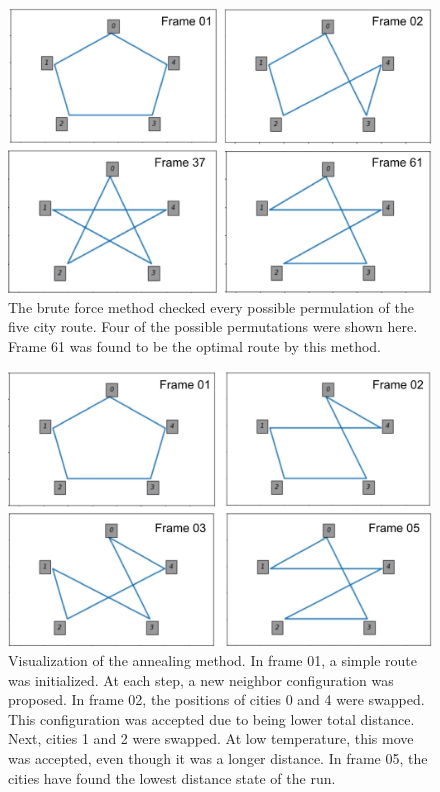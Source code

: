 \message{ !name(Assn1.tex)}\documentclass[twocolumn]{article}
\begin{document}
\begin{figure}
\centering
\includegraphics[width=\linewidth]{brute_4frames}
\caption{The brute force method checked every possible permulation of the five city route. Four of the possible permutations were shown here. Frame 61 was found to be the optimal route by this method.}
\label{fig:brute_4frames}
\end{figure}

\begin{figure}
\centering
\includegraphics[width=\linewidth]{anneal_4frames}
\caption{Visualization of the annealing method. In frame 01, a simple route was initialized. At each step, a new neighbor configuration was proposed. In frame 02, the positions of cities 0 and 4 were swapped. This configuration was accepted due to being lower total distance. Next, cities 1 and 2 were swapped. At low temperature, this move was accepted, even though it was a longer distance. In frame 05, the cities have found the lowest distance state of the run.}
\label{fig:anneal_4frames}
\end{figure}
\end{document}
